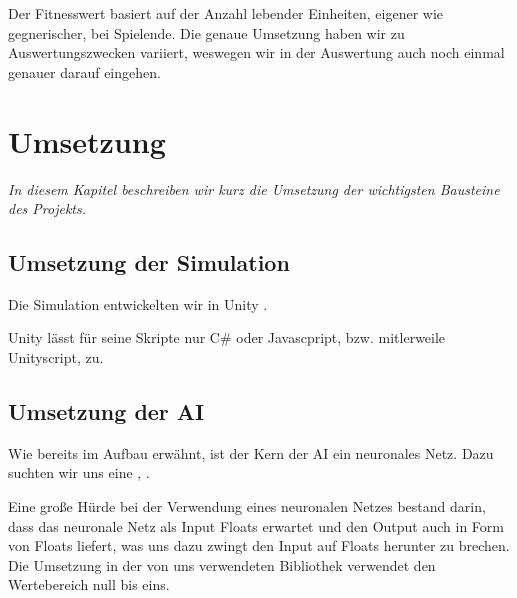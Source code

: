 \documentclass[
	12pt,
	a4paper,
	BCOR10mm,
	DIV14,
	headsepline,
	usegeometry,
]{scrreprt}
\begin{document}
Der Fitnesswert basiert auf der Anzahl lebender Einheiten, eigener wie gegnerischer, bei Spielende.
Die genaue Umsetzung haben wir zu Auswertungszwecken variiert, weswegen wir in der Auswertung auch noch einmal genauer darauf eingehen.

\chapter{Umsetzung}
\label{Umsetzung}

\textit{%
In diesem Kapitel beschreiben wir kurz die Umsetzung der wichtigsten Bausteine des Projekts.
}

\bigskip

\section{Umsetzung der Simulation}

Die Simulation entwickelten wir in Unity \cite{unity}.

Unity lässt für seine Skripte nur C\# oder Javascpript, bzw. mitlerweile Unityscript, zu.


\section{Umsetzung der AI}
Wie bereits im Aufbau erwähnt, ist der Kern der AI ein neuronales Netz.
Dazu suchten wir uns eine  \cite{nn-bib}, .

Eine große Hürde bei der Verwendung eines neuronalen Netzes bestand darin, dass das neuronale Netz als Input Floats erwartet und den Output auch in Form von Floats liefert, was uns dazu zwingt den Input auf Floats herunter zu brechen.
Die Umsetzung in der von uns verwendeten Bibliothek verwendet den Wertebereich null bis eins.
\end{document}
